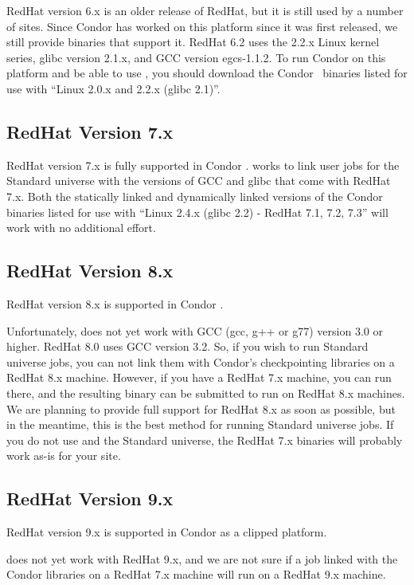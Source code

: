 RedHat version 6.x is an older release of RedHat, but it is still used
by a number of sites.
Since Condor has worked on this platform since it was first released,
we still provide binaries that support it.
RedHat 6.2 uses the 2.2.x Linux kernel series, glibc version 2.1.x,
and GCC version egcs-1.1.2.
To run Condor on this platform and be able to use ,
you should download the Condor \VersionNotice\  binaries listed for use
with ``Linux 2.0.x and 2.2.x (glibc 2.1)''.


\subsection{\label{sec:platform-linux-rh7}RedHat Version 7.x}

RedHat version 7.x is fully supported in Condor \VersionNotice.
 works to link user jobs for the Standard universe
with the versions of GCC and glibc that come with RedHat 7.x.
Both the statically linked and dynamically linked versions of the
Condor binaries listed for use with ``Linux 2.4.x (glibc 2.2) - RedHat
7.1, 7.2, 7.3'' will work with no additional effort.


\subsection{\label{sec:platform-linux-rh8}RedHat Version 8.x}

RedHat version 8.x is supported in Condor \VersionNotice.
  
Unfortunately,  does not yet work with GCC (gcc, g++
or g77) version 3.0 or higher.
RedHat 8.0 uses GCC version 3.2.
So, if you wish to run Standard universe jobs, you can not link them
with Condor's checkpointing libraries on a RedHat 8.x machine.
However, if you have a RedHat 7.x machine, you can run
 there, and the resulting binary can be submitted to
run on RedHat 8.x machines.
We are planning to provide full support for RedHat 8.x as soon as
possible, but in the meantime, this is the best method for running
Standard universe jobs.
If you do not use  and the Standard universe, the
RedHat 7.x binaries will probably work as-is for your site. 


\subsection{\label{sec:platform-linux-rh9}RedHat Version 9.x}

RedHat version 9.x is supported in Condor \VersionNotice as a clipped 
platform.

 does not yet work with RedHat 9.x, and we are not
sure if a job linked with the Condor libraries on a RedHat 7.x machine
will run on a RedHat 9.x machine.  
